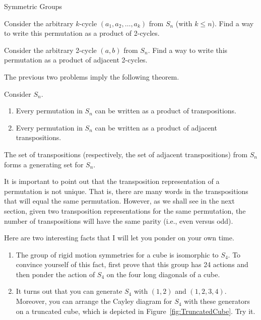 \begin{section}{Symmetric Groups}
\begin{problem}
Consider the arbitrary $k$-cycle $(a_1,a_2,\ldots, a_k)$ from $S_n$ (with $k\leq n$).  Find a way to write this permutation as a product of 2-cycles. 
\end{problem}

\begin{problem}
Consider the arbitrary 2-cycle $(a,b)$ from $S_n$.  Find a way to write this permutation as a product of adjacent 2-cycles.
\end{problem}

The previous two problems imply the following theorem.

\begin{theorem}
Consider $S_n$.
\begin{enumerate}[label=\rm{(\alph*)}]
\item Every permutation in $S_n$ can be written as a product of transpositions.
\item Every permutation in $S_n$ can be written as a product of adjacent transpositions.
\end{enumerate}
\end{theorem}

\begin{corollary}
The set of transpositions (respectively, the set of adjacent transpositions) from $S_n$ forms a generating set for $S_n$.
\end{corollary}

It is important to point out that the transposition representation of a permutation is not unique.  That is, there are many words in the transpositions that will equal the same permutation.  However, as we shall see in the next section, given two transposition representations for the same permutation, the number of transpositions will have the same parity (i.e., even versus odd).

\begin{remark}
Here are two interesting facts that I will let you ponder on your own time.
\begin{enumerate}[label=\rm{(\alph*)}]
\item The group of rigid motion symmetries for a cube is isomorphic to $S_4$.  To convince yourself of this fact, first prove that this group has 24 actions and then ponder the action of $S_4$ on the four long diagonals of a cube.
\item It turns out that you can generate $S_4$ with $(1,2)$ and $(1,2,3,4)$.  Moreover, you can arrange the Cayley diagram for $S_4$ with these generators on a truncated cube, which is depicted in Figure~\ref{fig:TruncatedCube}.  Try it. 
\end{enumerate}
\end{remark}


\end{section}
